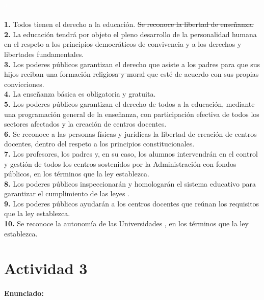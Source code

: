 \textcolor{white}{a}\\\\
\textbf{1.
} Todos tienen el derecho a la educación.
 \sout{Se reconoce la libertad de enseñanza.
}\\
\textbf{2.
} La educación tendrá por objeto el pleno desarrollo de la personalidad humana en el respeto a los principios democráticos de convivencia y a los derechos y libertades fundamentales.
 \\
\textbf{3.
} Los poderes públicos garantizan el derecho que asiste a los padres para que sus hijos reciban una formación \sout{religiosa y moral} que esté de acuerdo con sus propias convicciones.
 \\
\textbf{4.
} La enseñanza básica es obligatoria y gratuita.
\\
\textbf{5.
} Los poderes públicos garantizan el derecho de todos a la educación, mediante una programación general de la enseñanza, con participación efectiva de todos los sectores afectados y la creación de centros docentes.
 \\
\textbf{6.
} Se reconoce a las personas físicas y jurídicas la libertad de creación de centros docentes, dentro del respeto a los principios constitucionales.
 \\
\textbf{7.
} Los profesores, los padres y, en su caso, los alumnos intervendrán en el control y gestión de todos los centros sostenidos por la Administración con fondos públicos, en los términos que la ley establezca.
\\
\textbf{8.
} Los poderes públicos inspeccionarán y homologarán el sistema educativo para garantizar el cumplimiento de las leyes .
 \\
\textbf{9.
} Los poderes públicos ayudarán a los centros docentes que reúnan los requisitos que la ley establezca.
\\
\textbf{10.
} Se reconoce la autonomía de las Universidades , en los términos que la ley establezca.
\\


\newpage
\section*{Actividad 3}
\paragraph{Enunciado: }

